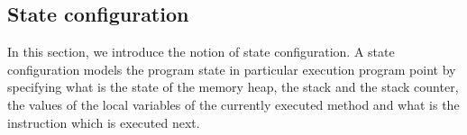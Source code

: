 


\newtheorem{StateProp0}{Substitution Property for Expressions}
\newtheorem{StateProp1}[StateProp0]{Substitution Property for Formulas}
\newtheorem{UpdateStateSem}[StateProp0]{Definition}


\newtheorem{AtState}{Definition}


\newtheorem{FormulaInterp}[AtState]{Definition}
\newtheorem{StateProp2}[AtState]{Substitution Property for Field Functions } %


\subsection{State configuration}\label{def}
 In this section, we introduce the notion of state configuration.
 A state configuration \SetConfigs models the program state in particular execution
 program point by specifying what is the state of the memory heap, the stack and the stack counter, the values of the
 local variables of the currently executed method  and what is the instruction which is executed next. 
 
